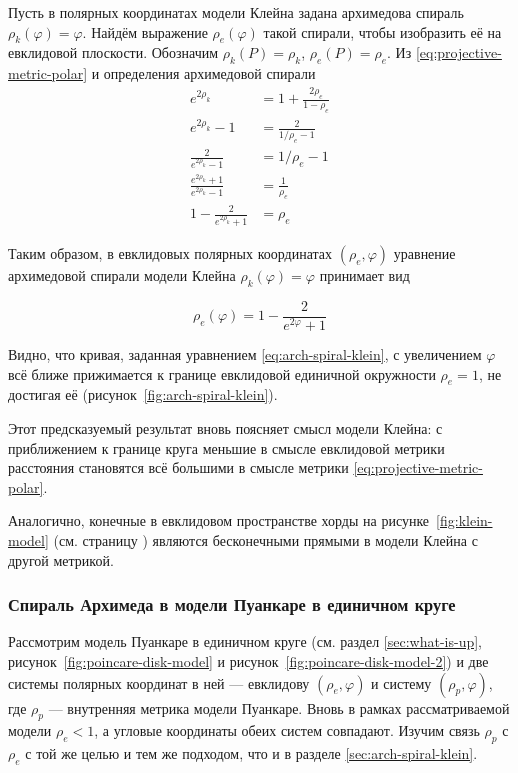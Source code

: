 \documentclass{article}
\numberwithin{equation}{section}
\renewcommand{\phi}{\varphi}
\begin{document}
Пусть в полярных координатах модели Клейна задана архимедова спираль
$\rho_k(\phi) = \phi$. Найдём выражение $\rho_e(\phi)$ такой спирали,
чтобы изобразить её на евклидовой плоскости. Обозначим $\rho_k(P) =
\rho_k$, $\rho_e(P) = \rho_e$. Из \eqref{eq:projective-metric-polar} и
определения архимедовой спирали
\begin{equation*}
  \begin{split}
    e^{2\rho_k} &= 1+\frac{2\rho_e}{1-\rho_e} \\
    e^{2\rho_k}-1 &= \frac{2}{1/\rho_e-1} \\
    \frac{2}{e^{2\rho_k}-1} &=1/\rho_e-1 \\
    \frac{e^{2\rho_k}+1}{e^{2\rho_k}-1} &= \frac{1}{\rho_e} \\
    1-\frac{2}{e^{2\rho_k}+1} &= \rho_e
  \end{split}
\end{equation*}

Таким образом, в евклидовых полярных координатах $(\rho_e, \phi)$
уравнение архимедовой спирали модели Клейна $\rho_k(\phi) = \phi$ принимает вид

\begin{equation}\label{eq:arch-spiral-klein}
  \rho_e(\phi) = 1-\frac{2}{e^{2\phi}+1}
\end{equation}



Видно, что кривая, заданная уравнением \eqref{eq:arch-spiral-klein}, с
увеличением $\phi$ всё ближе прижимается к границе евклидовой
единичной окружности $\rho_e=1$, не достигая её
(рисунок \ref{fig:arch-spiral-klein}).

Этот предсказуемый результат вновь поясняет смысл модели Клейна: с
приближением к границе круга меньшие в смысле евклидовой метрики
расстояния становятся всё большими в смысле метрики
\eqref{eq:projective-metric-polar}.

Аналогично, конечные в евклидовом пространстве хорды на
рисунке \ref{fig:klein-model} (см. страницу \pageref{fig:klein-model})
являются бесконечными прямыми в модели Клейна с другой метрикой.

\subsubsection{Спираль Архимеда в модели Пуанкаре в единичном круге}

Рассмотрим модель Пуанкаре в единичном круге (см. раздел
\ref{sec:what-is-up}, рисунок \ref{fig:poincare-disk-model} и
рисунок \ref{fig:poincare-disk-model-2}) и две системы полярных
координат в ней — евклидову $(\rho_e, \phi)$ и систему $(\rho_p,
\phi)$, где $\rho_p$ — внутренняя метрика модели Пуанкаре. Вновь в
рамках рассматриваемой модели $\rho_e<1$, а угловые координаты обеих
систем совпадают. Изучим связь $\rho_p$ с $\rho_e$ с той же целью и
тем же подходом, что и в разделе \ref{sec:arch-spiral-klein}.
\end{document}
